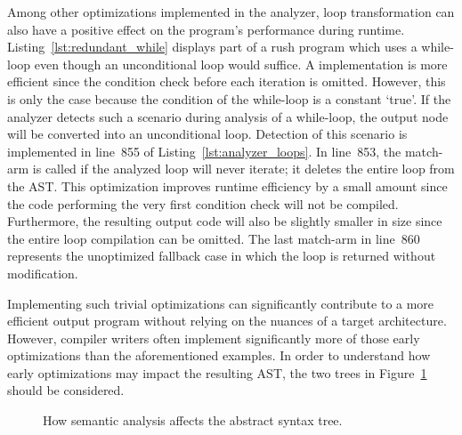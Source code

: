 Among other optimizations implemented in the analyzer, loop transformation can also have a positive effect on the program's performance during runtime.
Listing~\ref{lst:redundant_while} displays part of a rush program which uses a while-loop even though an unconditional loop would suffice.
A  implementation is more efficient since the condition check before each iteration is omitted.
However, this is only the case because the condition of the while-loop is a constant `true'.
If the analyzer detects such a scenario during analysis of a while-loop, the output node will be converted into an unconditional loop.
Detection of this scenario is implemented in line~855 of Listing~\ref{lst:analyzer_loops}.
In line~853, the match-arm is called if the analyzed loop will never iterate; it deletes the entire loop from the AST\@.
This optimization improves runtime efficiency by a small amount since the code performing the very first condition check will not be compiled.
Furthermore, the resulting output code will also be slightly smaller in size since the entire loop compilation can be omitted.
The last match-arm in line~860 represents the unoptimized fallback case in which the loop is returned without modification.


Implementing such trivial optimizations can significantly contribute to a more efficient output program without relying on the nuances of a target architecture.
However, compiler writers often implement significantly more of those early optimizations than the aforementioned examples.
In order to understand how early optimizations may impact the resulting AST,
the two trees in Figure~\ref{fig:analysis_tree_conv} should be considered.

\noindent
\begin{figure}[h]
	\centering
	\caption{How semantic analysis affects the abstract syntax tree.}\label{fig:analysis_tree_conv}
\end{figure}

